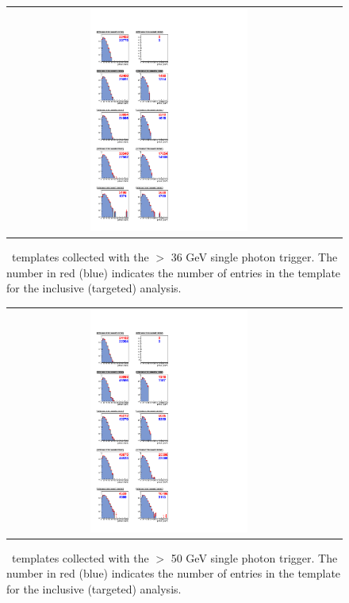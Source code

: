 \begin{figure}[!h]
\begin{center}
\begin{tabular}{cc}
\includegraphics[width=0.5\textwidth]{plots/template_targeted_1.pdf}
\end{tabular}
\caption{
\MET\ templates collected with the \pt $>$ 36 GeV single photon trigger.
The number in red (blue) indicates the number of entries in the template for the inclusive (targeted) analysis.
}
\end{center}
\end{figure}

\clearpage

\begin{figure}[!h]
\begin{center}
\begin{tabular}{cc}
\includegraphics[width=0.5\textwidth]{plots/template_targeted_2.pdf}
\end{tabular}
\caption{
\MET\ templates collected with the \pt $>$ 50 GeV single photon trigger.
The number in red (blue) indicates the number of entries in the template for the inclusive (targeted) analysis.
}
\end{center}
\end{figure}

